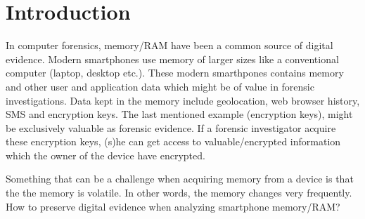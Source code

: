 \section{Introduction}


In computer forensics, memory/RAM have been a common source of digital evidence.
Modern smartphones use memory of larger sizes like a conventional computer (laptop, desktop etc.).
These modern smarthpones contains memory and other user and application  data which
might be of value in forensic investigations.
Data kept in the memory include geolocation, web browser history, SMS and encryption keys.
The last mentioned example (encryption keys), might be exclusively valuable as forensic evidence.
If a forensic investigator acquire these encryption keys, (s)he can get access to valuable/encrypted
information which the owner of the device have encrypted.

Something that can be a challenge when acquiring memory from a device is that the the memory is volatile.
In other words, the memory changes very frequently. 
How to preserve digital evidence when analyzing smartphone memory/RAM?

%
%

